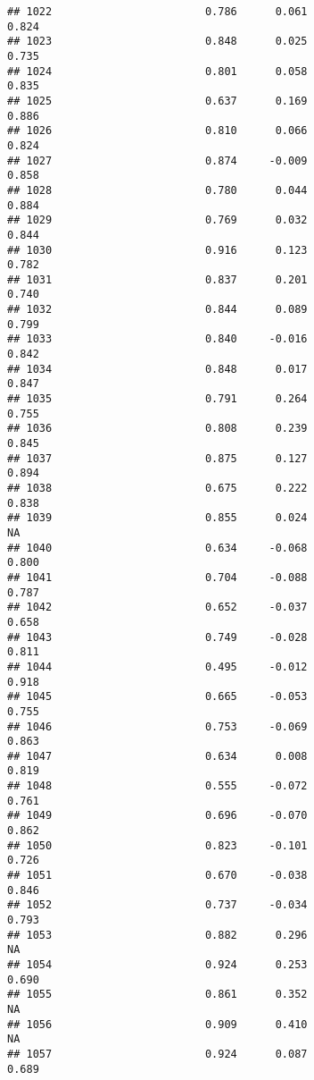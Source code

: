 \documentclass[
]{article}
\begin{document}
\begin{verbatim}
## 1022                        0.786      0.061                     0.824
## 1023                        0.848      0.025                     0.735
## 1024                        0.801      0.058                     0.835
## 1025                        0.637      0.169                     0.886
## 1026                        0.810      0.066                     0.824
## 1027                        0.874     -0.009                     0.858
## 1028                        0.780      0.044                     0.884
## 1029                        0.769      0.032                     0.844
## 1030                        0.916      0.123                     0.782
## 1031                        0.837      0.201                     0.740
## 1032                        0.844      0.089                     0.799
## 1033                        0.840     -0.016                     0.842
## 1034                        0.848      0.017                     0.847
## 1035                        0.791      0.264                     0.755
## 1036                        0.808      0.239                     0.845
## 1037                        0.875      0.127                     0.894
## 1038                        0.675      0.222                     0.838
## 1039                        0.855      0.024                        NA
## 1040                        0.634     -0.068                     0.800
## 1041                        0.704     -0.088                     0.787
## 1042                        0.652     -0.037                     0.658
## 1043                        0.749     -0.028                     0.811
## 1044                        0.495     -0.012                     0.918
## 1045                        0.665     -0.053                     0.755
## 1046                        0.753     -0.069                     0.863
## 1047                        0.634      0.008                     0.819
## 1048                        0.555     -0.072                     0.761
## 1049                        0.696     -0.070                     0.862
## 1050                        0.823     -0.101                     0.726
## 1051                        0.670     -0.038                     0.846
## 1052                        0.737     -0.034                     0.793
## 1053                        0.882      0.296                        NA
## 1054                        0.924      0.253                     0.690
## 1055                        0.861      0.352                        NA
## 1056                        0.909      0.410                        NA
## 1057                        0.924      0.087                     0.689

\end{verbatim}
\end{document}
